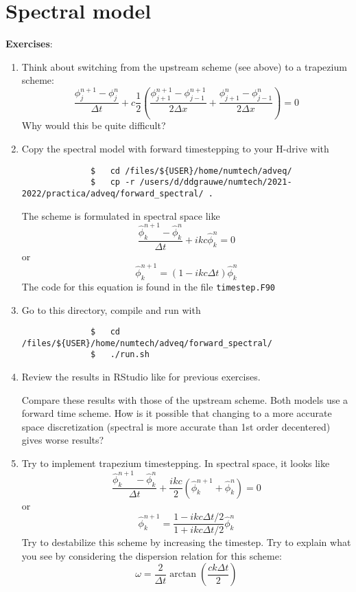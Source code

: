 \documentclass[a4paper]{article}
\begin{document}
\section{Spectral model}
%
\textbf{Exercises}:
%
\begin{enumerate}
	\item Think about switching from the upstream scheme (see above) to a trapezium scheme:
		\begin{equation*}
			\frac{\phi^{n+1}_{j}-\phi^{n}_{j}}{\Delta t}+c\frac{1}{2}\left(\frac{\phi^{n+1}_{j+1}-\phi^{n+1}_{j-1}}{2\Delta x}+\frac{\phi^{n}_{j+1}-\phi^{n}_{j-1}}{2\Delta x}\right)=0
		\end{equation*}
		Why would this be quite difficult?
	\item Copy the spectral model with forward timestepping to your H-drive with
		\begin{verbatim}
			  $   cd /files/${USER}/home/numtech/adveq/ 
			  $   cp -r /users/d/ddgrauwe/numtech/2021-2022/practica/adveq/forward_spectral/ .
		\end{verbatim}
		The scheme is formulated in spectral space like
		\begin{equation*}
			\frac{\hat\phi_k^{n+1}-\hat\phi_k^{n}}{\Delta t}+ikc\hat\phi_k^n=0
		\end{equation*}
		or
		\begin{equation*}
			\hat\phi_k^{n+1}=(1-ikc\Delta t)\hat\phi_k^n
		\end{equation*}
		The code for this equation is found in the file \verb+timestep.F90+
	\item Go to this directory, compile and run with
		\begin{verbatim}
			  $   cd /files/${USER}/home/numtech/adveq/forward_spectral/
			  $   ./run.sh
		\end{verbatim}
	\item Review the results in RStudio like for previous exercises.
		\par
Compare these results with those of the upstream scheme. Both models use a forward time scheme. How is it possible that changing to a more accurate space discretization (spectral is more accurate than 1st order decentered) gives worse results?
	\item Try to implement trapezium timestepping. In spectral space, it looks like
		\begin{equation*}
			\frac{\hat\phi^{n+1}_{k}-\hat\phi^{n}_{k}}{\Delta t}+\frac{ikc}{2}\left(\hat\phi^{n+1}_{k}+\hat\phi^{n}_{k}\right)=0
		\end{equation*}
		or
		\begin{equation*}
			\hat\phi^{n+1}_{k}=\frac{1-ikc\Delta t/2}{1+ikc\Delta t/2}\hat\phi_k^n
		\end{equation*}
		Try to destabilize this scheme by increasing the timestep. Try to explain what you see by considering the dispersion relation for this scheme:
		\begin{equation*}
			\omega=\frac{2}{\Delta t}\arctan\left(\frac{ck\Delta t}{2}\right)
		\end{equation*}
\end{enumerate}
%
\end{document}
